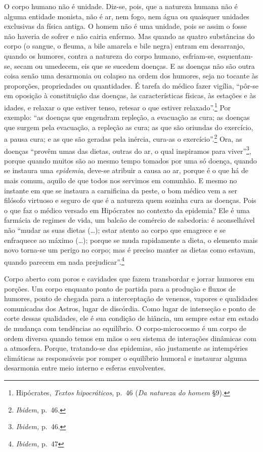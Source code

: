 O corpo humano não é unidade. Diz-se, pois, que a natureza humana não é
alguma entidade monista, não é ar, nem fogo, nem água ou quaisquer
unidades exclusivas da física antiga. O homem não é uma unidade, pois se
assim o fosse não haveria de sofrer e não cairia enfermo. Mas quando as
quatro substâncias do corpo (o sangue, o fleuma, a bile amarela e bile
negra) entram em desarranjo, quando os humores, contra a natureza do
corpo humano, esfriam-se, esquentam-se, secam ou umedecem, eis que se
sucedem doenças. E as doenças não são outra coisa senão uma desarmonia
ou colapso na ordem dos humores, seja no tocante às proporções,
propriedades ou quantidades. É tarefa do médico fazer vigília, ``pôr-se
em oposição à constituição das doenças, às características físicas, às
estações e às idades, e relaxar o que estiver tenso, retesar o que
estiver relaxado''.\footnote{Hipócrates, \textit{Textos hipocráticos},
  p.~46 (\textit{Da natureza do homem} §9).} Por exemplo: ``as doenças que
engendram repleção, a evacuação as cura; as doenças que surgem pela
evacuação, a repleção as cura; as que são oriundas do exercício, a pausa
cura; e as que são geradas pela inércia, cura-as o
exercício''.\footnote{\textit{Ibidem}, p.~46.} Ora, as doenças ``provêm
umas das dietas, outras do ar, o qual inspiramos para viver''\footnote{\textit{Ibidem,}
  p.~46.}, porque quando muitos são ao mesmo tempo tomados por uma só
doença, quando se instaura uma \textit{epidemia}, deve-se atribuir a causa
ao ar, porque é o que há de mais comum, aquilo de que todos nos servimos
em comunhão. E mesmo no instante em que se instaura a carnificina da
peste, o bom médico vem a ser filósofo virtuoso e seguro de que é a
natureza quem sozinha cura as doenças. Pois o que faz o médico versado
em Hipócrates no contexto da epidemia? Ele é uma farmácia de regimes de
vida, um balcão de comércio de sabedoria: é aconselhável não ``mudar as
suas dietas (\dots{}); estar atento ao corpo que emagrece e se enfraquece ao
máximo (\dots{}); porque se muda rapidamente a dieta, o elemento mais novo
torna-se um perigo no corpo; mas é preciso manter as dietas como
estavam, quando parecem em nada prejudicar''.\footnote{\textit{Ibidem,}
  p.~47}

Corpo aberto com poros e cavidades que fazem transbordar e jorrar
humores em porções. Um corpo enquanto ponto de partida para a produção e
fluxos de humores, ponto de chegada para a interceptação de venenos,
vapores e qualidades comunicadas dos Astros, lugar de discórdia. Como
lugar de interseção e ponto de corte dessas qualidades, ele é sua
condição de hiância, um sempre estar em estado de mudança com tendências
ao equilíbrio. O corpo-microcosmo é um corpo de ordem diversa quando
temos em mãos o seu sistema de interações dinâmicas com a atmosfera.
Porque, tratando-se das epidemias, são justamente as intempéries
climáticas as responsáveis por romper o equilíbrio humoral e instaurar
alguma desarmonia entre meio interno e esferas envolventes.

